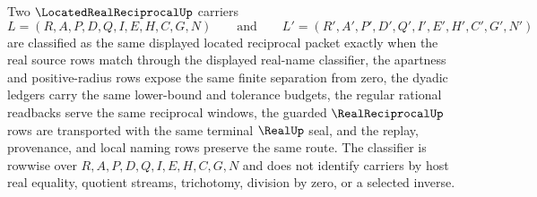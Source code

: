 \begin{definition}
\label{def:located-real-reciprocal-classifier}
Two $\LocatedRealReciprocalUp$ carriers
$$
L=(R,A,P,D,Q,I,E,H,C,G,N)
\qquad\text{and}\qquad
L'=(R',A',P',D',Q',I',E',H',C',G',N')
$$
are classified as the same displayed located reciprocal packet exactly when the real source rows match through the displayed real-name classifier, the apartness and positive-radius rows expose the same finite separation from zero, the dyadic ledgers carry the same lower-bound and tolerance budgets, the regular rational readbacks serve the same reciprocal windows, the guarded $\RealReciprocalUp$ rows are transported with the same terminal $\RealUp$ seal, and the replay, provenance, and local naming rows preserve the same route. The classifier is rowwise over $R,A,P,D,Q,I,E,H,C,G,N$ and does not identify carriers by host real equality, quotient streams, trichotomy, division by zero, or a selected inverse.
\end{definition}

